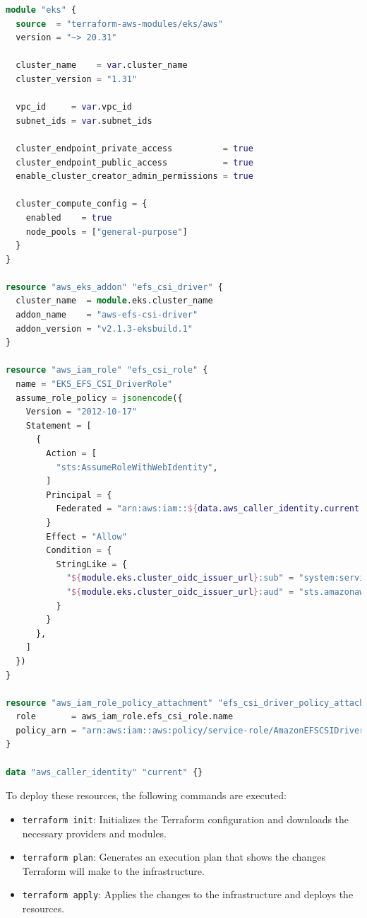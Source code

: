 \begin{lstlisting}[language=Terraform, caption={Terraform Configuration for Creating EFS CSI Driver}, label={lst:efs_csi_driver},breaklines=true]
module "eks" {
  source  = "terraform-aws-modules/eks/aws"
  version = "~> 20.31"

  cluster_name    = var.cluster_name
  cluster_version = "1.31"

  vpc_id     = var.vpc_id
  subnet_ids = var.subnet_ids

  cluster_endpoint_private_access          = true
  cluster_endpoint_public_access           = true
  enable_cluster_creator_admin_permissions = true

  cluster_compute_config = {
    enabled    = true
    node_pools = ["general-purpose"]
  }
}

resource "aws_eks_addon" "efs_csi_driver" {
  cluster_name  = module.eks.cluster_name
  addon_name    = "aws-efs-csi-driver"
  addon_version = "v2.1.3-eksbuild.1"
}

resource "aws_iam_role" "efs_csi_role" {
  name = "EKS_EFS_CSI_DriverRole"
  assume_role_policy = jsonencode({
    Version = "2012-10-17"
    Statement = [
      {
        Action = [
          "sts:AssumeRoleWithWebIdentity",
        ]
        Principal = {
          Federated = "arn:aws:iam::${data.aws_caller_identity.current.account_id}: oidc-provider/${module.eks.cluster_oidc_issuer_url}"
        }
        Effect = "Allow"
        Condition = {
          StringLike = {
            "${module.eks.cluster_oidc_issuer_url}:sub" = "system:serviceaccount:kube-system:efs-csi-*",
            "${module.eks.cluster_oidc_issuer_url}:aud" = "sts.amazonaws.com"
          }
        }
      },
    ]
  })
}

resource "aws_iam_role_policy_attachment" "efs_csi_driver_policy_attachment" {
  role       = aws_iam_role.efs_csi_role.name
  policy_arn = "arn:aws:iam::aws:policy/service-role/AmazonEFSCSIDriverPolicy"
}

data "aws_caller_identity" "current" {}
\end{lstlisting}

To deploy these resources, the following commands are executed:
\begin{itemize}
    \item \texttt{terraform init}: Initializes the Terraform configuration and downloads the necessary providers and modules.
    \item \texttt{terraform plan}: Generates an execution plan that shows the changes Terraform will make to the infrastructure.
    \item \texttt{terraform apply}: Applies the changes to the infrastructure and deploys the resources.
\end{itemize}


